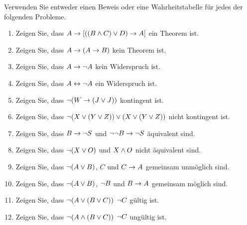 \practiceproblems
\noindent\problempart Verwenden Sie entweder einen Beweis oder eine Wahrheitstabelle für jedes der folgenden Probleme.  
\begin{enumerate}%
\item Zeigen Sie, dass $A \rightarrow [((B \wedge C) \vee D) \rightarrow A]$ ein Theorem ist.
\item Zeigen Sie, dass $A \rightarrow (A \rightarrow B)$ kein Theorem ist.
\item Zeigen Sie, dass $A \rightarrow \neg{A}$ kein Widerspruch ist.
\item Zeigen Sie, dass $A \leftrightarrow \neg A$ ein Widerspruch ist. 
\item Zeigen Sie, dass $ \neg (W \rightarrow (J \vee J)) $ kontingent ist.
\item Zeigen Sie, dass $ \neg(X \vee (Y \vee Z)) \vee (X \vee (Y \vee Z))$ nicht kontingent ist.
 \item Zeigen Sie, dass $B \rightarrow \neg S$ und $\neg \neg B \rightarrow \neg S$ äquivalent sind.
\item Zeigen Sie, dass $ \neg (X \vee O) $ und $X \wedge O$ nicht äquivalent sind.
\item Zeigen Sie, dass $\neg(A \vee B)$, $C$ und $C \rightarrow A$  gemeinsam unmöglich sind.
\item Zeigen Sie, dass $\neg(A \vee B)$, $\neg{B}$ und $B \rightarrow A$ gemeinsam möglich sind.
\item Zeigen Sie, dass $\neg(A \vee (B \vee C)) $ \therefore $ \neg{C}$ gültig ist.
\item Zeigen Sie, dass $\neg(A \wedge (B \vee C))$ \therefore $ \neg{C}$ ungültig ist. 
\end{enumerate}


